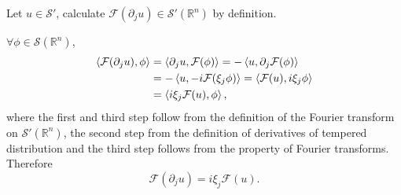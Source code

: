 \begin{pro}
  Let $u\in\mathcal{S}'$,
  calculate
  $\mathcal{F}(\partial_ju)\in\mathcal{S}'(\mathbb{R}^n)$
  by definition.
\end{pro}

\begin{sol}
  $\forall \phi\in\mathcal{S}(\mathbb{R}^n)$,
  \begin{align*}
    \left\langle\mathcal{F}(\partial_ju), \phi\right\rangle &= \left\langle\partial_ju, \mathcal{F}(\phi)\right\rangle = -\left\langle u, \partial_j\mathcal{F}(\phi)\right\rangle \\
                                           &= -\left\langle u, -i\mathcal{F}(\xi_j\phi)\right\rangle
                                             = \left\langle \mathcal{F}(u), i\xi_j\phi\right\rangle \\
    &= \left\langle i\xi_j\mathcal{F}(u), \phi\right\rangle,
  \end{align*}
  where the first and third step follow from the definition
  of the Fourier transform on $\mathcal{S}'(\mathbb{R}^n)$,
  the second step from the definition of derivatives of
  tempered distribution and the third step follows from
  the property of Fourier transforms. Therefore
  \begin{displaymath}
    \mathcal{F}(\partial_ju) = i\xi_j\mathcal{F}(u).
  \end{displaymath}
\end{sol}
